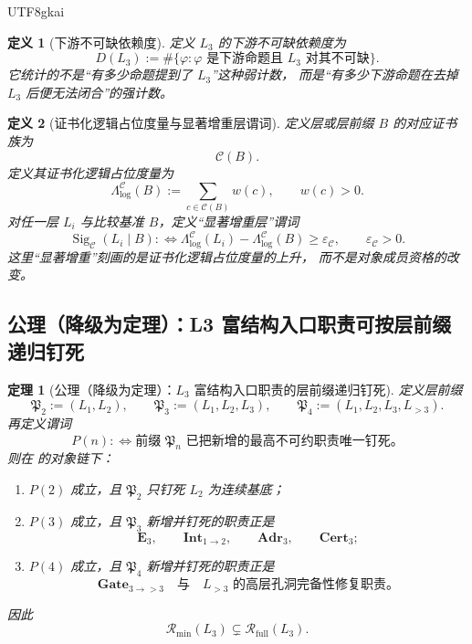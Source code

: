 \documentclass[12pt]{article}
\newtheorem{definition}{定义}[section]
\newtheorem{theorem}{定理}[section]
\begin{document}
\begin{CJK*}{UTF8}{gkai}
\begin{definition}[下游不可缺依赖度]
\label{def:tex1-ch12-depend}
定义 \(L_3\) 的下游不可缺依赖度为
\[
  D(L_3)
  :=
  \#\bigl\{
    \varphi:
    \varphi\text{ 是下游命题且 }L_3\text{ 对其不可缺}
  \bigr\}.
\]
它统计的不是“有多少命题提到了 \(L_3\)”这种弱计数，
而是“有多少下游命题在去掉 \(L_3\) 后便无法闭合”的强计数。
\end{definition}

\begin{definition}[证书化逻辑占位度量与显著增重层谓词]
\label{def:tex1-ch12-certlogical}
定义层或层前缀 \(B\) 的对应证书族为
\[
  \mathcal C(B).
\]
定义其证书化逻辑占位度量为
\[
  \Lambda_{\mathrm{log}}^{\mathcal C}(B)
  :=
  \sum_{c\in \mathcal C(B)} w(c),
  \qquad
  w(c)>0.
\]
对任一层 \(L_i\) 与比较基准 \(B\)，定义“显著增重层”谓词
\[
  \operatorname{Sig}_{\mathcal C}(L_i\mid B)
  :
  \Longleftrightarrow
  \Lambda_{\mathrm{log}}^{\mathcal C}(L_i)-\Lambda_{\mathrm{log}}^{\mathcal C}(B)
  \ge
  \varepsilon_{\mathcal C},
  \qquad
  \varepsilon_{\mathcal C}>0.
\]
这里“显著增重”刻画的是证书化逻辑占位度量的上升，
而不是对象成员资格的改变。
\end{definition}

\subsection{公理（降级为定理）：L3 富结构入口职责可按层前缀递归钉死}
\label{subsec:tex1-ch12-axiom}

\begin{theorem}[公理（降级为定理）：\(L_3\) 富结构入口职责的层前缀递归钉死]
\label{thm:tex1-ch12-axiom-downgraded}
定义层前缀
\[
  \mathfrak P_2:=(L_1,L_2),\qquad
  \mathfrak P_3:=(L_1,L_2,L_3),\qquad
  \mathfrak P_4:=(L_1,L_2,L_3,L_{>3}).
\]
再定义谓词
\[
  P(n)
  :
  \Longleftrightarrow
  \text{前缀 }\mathfrak P_n\text{ 已把新增的最高不可约职责唯一钉死。}
\]
则在 \cite{RepoTex41HomotopyRepairBundle} 的对象链下：
\begin{enumerate}
  \item \(P(2)\) 成立，且 \(\mathfrak P_2\) 只钉死 \(L_2\) 为连续基底；
  \item \(P(3)\) 成立，且 \(\mathfrak P_3\) 新增并钉死的职责正是
  \[
    \mathbf E_3,\qquad \mathbf{Int}_{1\to2},\qquad \mathbf{Adr}_3,\qquad \mathbf{Cert}_3;
  \]
  \item \(P(4)\) 成立，且 \(\mathfrak P_4\) 新增并钉死的职责正是
  \[
    \mathbf{Gate}_{3\to >3}
    \quad\text{与}\quad
    L_{>3}\text{ 的高层孔洞完备性修复职责。}
  \]
\end{enumerate}
因此
\[
  \boxed{
    \mathcal R_{\mathrm{min}}(L_3)
    \subsetneq
    \mathcal R_{\mathrm{full}}(L_3).
  }
\]
\end{theorem}


\end{CJK*}
\end{document}

